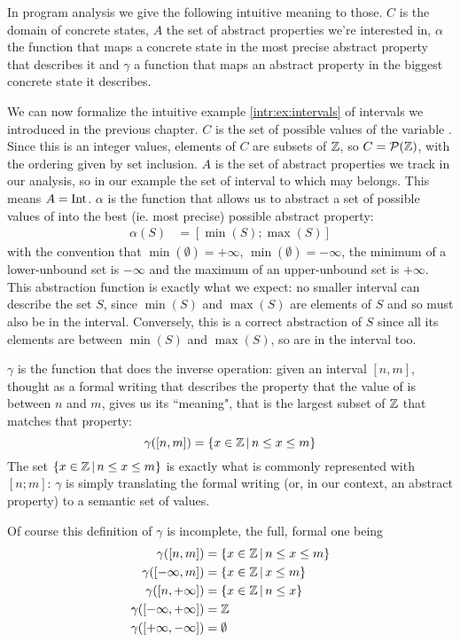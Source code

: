 In program analysis we give the following intuitive meaning to those. $C$ is the domain of concrete states, $A$ the set of abstract properties we're interested in, $\alpha$ the function that maps a concrete state in the most precise abstract property that describes it and $\gamma$ a function that maps an abstract property in the biggest concrete state it describes.

\begin{example}[Intervals]\label{ch2:ex:intervals}
	We can now formalize the intuitive example \ref{intr:ex:intervals} of intervals we introduced in the previous chapter.
	$C$ is the set of possible values of the variable . Since this is an integer values, elements of $C$ are subsets of $\mathbb{Z}$, so $C = \mathcal{P}(\mathbb{Z})$, with the ordering given by set inclusion. $A$ is the set of abstract properties we track in our analysis, so in our example the set of interval to which  may belongs. This means $A = \text{Int}$.
	$\alpha$ is the function that allows us to abstract a set of possible values of  into the best (ie. most precise) possible abstract property:
	\begin{align*}
		\alpha(S) &= [\min(S); \max(S)]
	\end{align*}
	with the convention that $\min(\emptyset) = +\infty$, $\min(\emptyset) = -\infty$, the minimum of a lower-unbound set is $-\infty$ and the maximum of an upper-unbound set is $+\infty$. This abstraction function is exactly what we expect: no smaller interval can describe the set $S$, since $\min(S)$ and $\max(S)$ are elements of $S$ and so must also be in the interval. Conversely, this is a correct abstraction of $S$ since all its elements are between $\min(S)$ and $\max(S)$, so are in the interval too.
	
	$\gamma$ is the function that does the inverse operation: given an interval $[n, m]$, thought as a formal writing that describes the property that the value of  is between $n$ and $m$, gives us its ``meaning", that is the largest subset of $\mathbb{Z}$ that matches that property:
	\[
	\gamma([n, m]) = \{ x \in \mathbb{Z} \,\vert\, n \le x \le m \}
	\]
	The set $\{ x \in \mathbb{Z} \,\vert\, n \le x \le m \}$ is exactly what is commonly represented with $[n; m]$: $\gamma$ is simply translating the formal writing (or, in our context, an abstract property) to a semantic set of values.

	Of course this definition of $\gamma$ is incomplete, the full, formal one being
	\begin{align*}
		\gamma([n, m]) &= \{ x \in \mathbb{Z} \,\vert\, n \le x \le m \} \\
		\gamma([-\infty, m]) &= \{ x \in \mathbb{Z} \,\vert\, x \le m \} \\
		\gamma([n, +\infty]) &= \{ x \in \mathbb{Z} \,\vert\, n \le x \} \\
		\gamma([-\infty, +\infty]) &= \mathbb{Z} \\
		\gamma([+\infty, -\infty]) &= \emptyset
	\end{align*}


\end{example}
